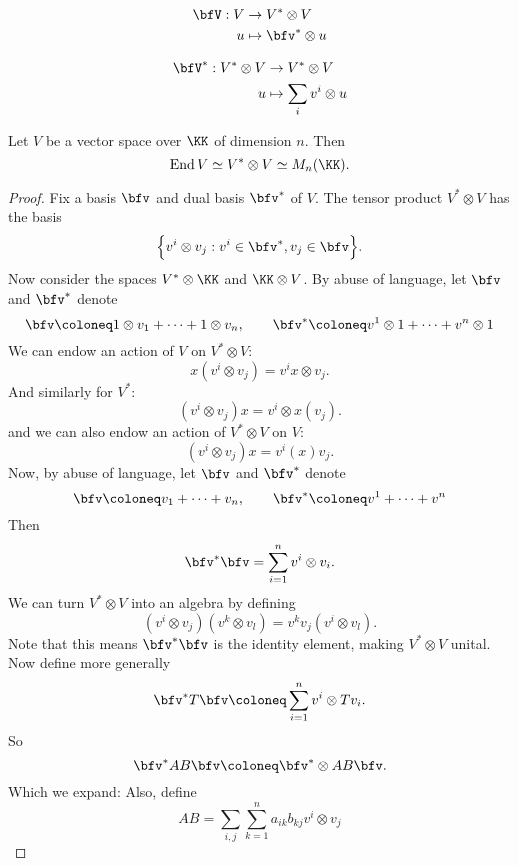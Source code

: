 \documentclass{article}
\DeclareMathOperator{\End}{End}
\begin{document}
\begin{align*}
    \bfV:
    V
    &\to
    V^\ast \otimes V
    \\
    u
    &\mapsto 
    \bfv^\ast \otimes u
\end{align*}

\begin{align*}
    \bfV^\ast:
    V^\ast \otimes V
    &\to
    V^\ast \otimes V
    \\
    u
    &\mapsto 
    \sum_i v^i \otimes u
\end{align*}

\begin{theorem}
    Let $V$ be a vector space over $\KK$ of dimension $n$.
    Then
    \[
        \End V
        \simeq
        V^\ast \otimes V
        \simeq
        M_n(\KK).
    \]
\end{theorem}

\begin{proof}
    Fix a basis $\bfv$ and dual basis $\bfv^\ast$ of $V$.
    The tensor product $V^\ast \otimes V$ has the basis
    \[
        \Big\{
            v^i \otimes v_j 
            :
            v^i \in \bfv^\ast,
            v_j \in \bfv
        \Big\}.
    \]
    Now consider the spaces $V^\ast \otimes \KK$ and $\KK \otimes V$.
    By abuse of language, let $\bfv$ and $\bfv^\ast$ denote
    \[
        \bfv
        \coloneq
        1 \otimes v_1 + \cdots + 1 \otimes v_n
        ,\qquad
        \bfv^\ast
        \coloneq
        v^1 \otimes 1 + \cdots + v^n \otimes 1
    \]
    We can endow an action of $V$ on $V^\ast \otimes V$:
    \[
        x(v^i \otimes v_j)
        =
        v^ix \otimes v_j.
    \]
    And similarly for $V^\ast$:
    \[
        (v^i \otimes v_j)x
        =
        v^i \otimes x(v_j).
    \]
    and we can also endow an action of $V^\ast \otimes V$ on $V$:
    \[
        (v^i \otimes v_j)x
        =
        v^i(x)v_j.
    \]
    Now, by abuse of language, let $\bfv$ and $\bfv^\ast$ denote
    \[
        \bfv
        \coloneq
        v_1 + \cdots + v_n
        ,\qquad
        \bfv^\ast
        \coloneq
        v^1 + \cdots + v^n
    \]
    Then
    \[
        \bfv^\ast \bfv
        =
        \sum_{i=1}^n
        v^i \otimes v_i.
    \]
    We can turn $V^\ast \otimes V$ into an algebra by defining
    \[
        (v^i \otimes v_j)(v^k \otimes v_l)
        =
        v^kv_j
        (v^i \otimes v_l).
    \]
    Note that this means $\bfv^\ast \bfv$ is the identity element, making $V^\ast \otimes V$ unital.
    Now define more generally
    \[
        \bfv^\ast T \bfv
        \coloneq
        \sum_{i=1}^n
        v^i \otimes Tv_i.
    \]
    So
    \[
        \bfv^\ast AB \bfv
        \coloneq
        \bfv^\ast \otimes AB\bfv.
    \]
    Which we expand:
    Also, define
    \[
        AB
        =
        \sum_{i,j}
        \sum_{k=1}^n
        a_{ik}b_{kj}
        v^i \otimes v_j
    \]
\end{proof}
\end{document}
